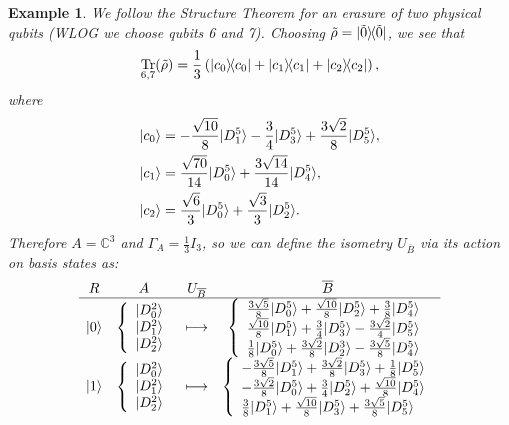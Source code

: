 \documentclass[]{amsart}
\DeclarePairedDelimiter\bra{\langle}{\rvert}
\DeclarePairedDelimiter\ket{\lvert}{\rangle}
\DeclareMathOperator{\Tr}{Tr}
\newtheorem{example}[theorem]{Example}
\begin{document}
\begin{example}
    We follow the Structure Theorem for an erasure of two physical qubits (WLOG we choose qubits 6 and 7). Choosing $\tilde{\rho}=\ket{\tilde{0}}\!\bra{\tilde{0}}$, we see that
    \begin{equation*}
        \Tr_{6,7}\!\left(\tilde{\rho}\right)=\frac{1}{3}\left(\ket{c_0}\!\bra{c_0}+\ket{c_1}\!\bra{c_1}+\ket{c_2}\!\bra{c_2} \right),
    \end{equation*}
    where
    \begin{align*}
        \ket{c_0} & = -\frac{\sqrt{10}}{8}\ket{D_1^5}-\frac{3}{4}\ket{D_3^5}+\frac{3\sqrt{2}}{8}\ket{D_5^5}, \\
        \ket{c_1} & = \frac{\sqrt{70}}{14}\ket{D_0^5}+\frac{3\sqrt{14}}{14}\ket{D_4^5}, \\
        \ket{c_2} & = \frac{\sqrt{6}}{3}\ket{D_0^5}+\frac{\sqrt{3}}{3}\ket{D_2^5}.
    \end{align*}
    Therefore $A=\mathbb{C}^3$ and $\Gamma_A=\frac{1}{3}I_3$, so we can define the isometry $U_{\overline{B}}$ via its action on basis states as:
    \begin{equation*}
        \begin{array}{cccc} 
            R & A & U_{\overline{B}}  & \overline{B}  \\ \hline 
            \ket{0} & \left\{ \begin{array}{l}  \ket{D_0^2} \\ \ket{D_1^2} \\ \ket{D_2^2} \end{array} \right. & \longmapsto & \left\{ \begin{array}{l} \frac{3\sqrt{5}}{8}\ket{D_0^5}+\frac{\sqrt{10}}{8}\ket{D_2^5}+\frac{3}{8}\ket{D_4^5} \\ \frac{\sqrt{10}}{8}\ket{D_1^5}+\frac{3}{4}\ket{D_3^5}-\frac{3\sqrt{2}}{4}\ket{D_5^5} \\ \frac{1}{8}\ket{D_0^5}+\frac{3\sqrt{2}}{8}\ket{D_2^3}-\frac{3\sqrt{5}}{8}\ket{D_4^5} \end{array} \right. \\ 
            \ket{1} & \left\{ \begin{array}{l}  \ket{D_0^2} \\ \ket{D_1^2} \\ \ket{D_2^2} \end{array} \right. & \longmapsto & \left\{ \begin{array}{l} -\frac{3\sqrt{5}}{8}\ket{D_1^5}+\frac{3\sqrt{2}}{8}\ket{D_3^5}+\frac{1}{8}\ket{D_5^5} \\ -\frac{3\sqrt{2}}{8}\ket{D_0^5}+\frac{3}{4}\ket{D_2^5}+\frac{\sqrt{10}}{8}\ket{D_4^5} \\ \frac{3}{8}\ket{D_1^5}+\frac{\sqrt{10}}{8}\ket{D_3^5}+\frac{3\sqrt{5}}{8}\ket{D_5^5} \end{array} \right. \\  

\end{array}
\end{equation*}
\end{example}
\end{document}
